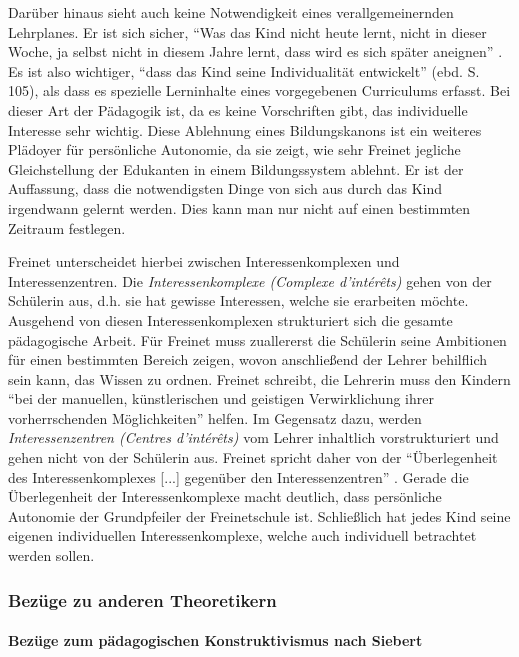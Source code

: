 Darüber hinaus sieht \citeauthor{Freinet1979} auch keine Notwendigkeit eines verallgemeinernden Lehrplanes.
Er ist sich sicher, ``Was das Kind nicht heute lernt, nicht in dieser Woche, ja selbst nicht in diesem Jahre lernt, dass wird es sich später aneignen'' \parencite[~101]{Freinet1979}.
Es ist also wichtiger, ``dass das Kind seine Individualität entwickelt'' (ebd. S. 105), als dass es spezielle Lerninhalte eines vorgegebenen Curriculums erfasst.
Bei dieser Art der Pädagogik ist, da es keine Vorschriften gibt, das individuelle Interesse sehr wichtig.
Diese Ablehnung eines Bildungskanons ist ein weiteres Plädoyer für persönliche Autonomie, da sie zeigt, wie sehr Freinet jegliche Gleichstellung der Edukanten in einem Bildungssystem ablehnt.
Er ist der Auffassung, dass die notwendigsten Dinge von sich aus durch das Kind irgendwann gelernt werden.
Dies kann man nur nicht auf einen bestimmten Zeitraum festlegen.

Freinet unterscheidet hierbei zwischen Interessenkomplexen und Interessenzentren.
Die \emph{Interessenkomplexe (Complexe d'intérêts)} gehen von der Schülerin aus, d.h. sie hat gewisse Interessen, welche sie erarbeiten möchte.
Ausgehend von diesen Interessenkomplexen strukturiert sich die gesamte pädagogische Arbeit.
Für Freinet muss zuallererst die Schülerin seine Ambitionen für einen bestimmten Bereich zeigen, wovon anschließend der Lehrer behilflich sein kann, das Wissen zu ordnen.
Freinet schreibt, die Lehrerin muss den Kindern ``bei der manuellen, künstlerischen und geistigen Verwirklichung ihrer vorherrschenden Möglichkeiten'' \parencite[~90]{Freinet1979} helfen.
Im Gegensatz dazu, werden \emph{Interessenzentren (Centres d'intérêts)} vom Lehrer inhaltlich vorstrukturiert und gehen nicht von der Schülerin aus.
Freinet spricht daher von der ``Überlegenheit des Interessenkomplexes [...] gegenüber den Interessenzentren'' \parencite[~89]{Freinet1979}.
Gerade die Überlegenheit der Interessenkomplexe macht deutlich, dass persönliche Autonomie der Grundpfeiler der Freinetschule ist.
Schließlich hat jedes Kind seine eigenen individuellen Interessenkomplexe, welche auch individuell betrachtet werden sollen.


\subsubsection{Bezüge zu anderen Theoretikern}


\paragraph{Bezüge zum pädagogischen Konstruktivismus nach Siebert}

